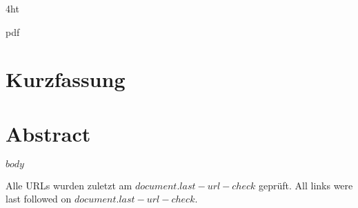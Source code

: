 \documentclass[fontsize=12pt, paper=a4, twoside, BCOR=3mm, DIV=13,
	headinclude=true, footinclude=false, bibliography=totoc, headsepline,
       cleardoublepage=empty, parskip=half, final]{scrbook}
\let\ifdeutsch\iftrue
\let\ifdeutsch\iffalse
\begin{document}
\iftex4ht
\Configure{$$}{\PicMath}{\EndPicMath}{}

         {pdf}
         {%
         }
\fi

%
%




\Titelblatt

\pagestyle{preamble}
\renewcommand*{\chapterpagestyle}{preamble}

\ifdeutsch
\section*{Kurzfassung}
\else
\section*{Abstract}
\fi




%
%
%
$body$


\clearpage


\printbibliography

\ifdeutsch
Alle URLs wurden zuletzt am $document.last-url-check$ geprüft.
\else
All links were last followed on $document.last-url-check$.
\fi

\pagestyle{empty}
\renewcommand*{\chapterpagestyle}{empty}
\Versicherung
\end{document}
